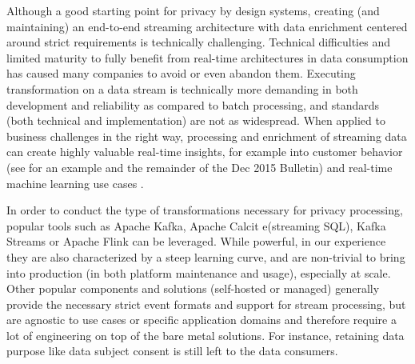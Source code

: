 \documentclass[11pt]{article} %
\begin{document}
Although a good starting point for privacy by design systems, creating (and maintaining) an end-to-end streaming architecture with data enrichment centered around strict requirements is technically challenging. Technical difficulties and limited maturity to fully benefit from real-time architectures in data consumption has caused many companies to avoid or even abandon them. Executing transformation on a data stream is technically more demanding in both development and reliability as compared to batch processing, and standards (both technical and implementation) are not as widespread. When applied to business challenges in the right way, processing and enrichment of streaming data can create highly valuable real-time insights, for example into customer behavior (see for an example \cite{fu2015streaming} and the remainder of the Dec 2015 Bulletin) and real-time machine learning use cases \cite{eugeneyan2021}. 


In order to conduct the type of transformations necessary for privacy processing, popular tools such as Apache Kafka, Apache Calcit e(streaming SQL), Kafka Streams or Apache Flink can be leveraged. While powerful, in our experience they are also characterized by a steep learning curve, and are non-trivial to bring into production (in both platform maintenance and usage), especially at scale. Other popular components and solutions (self-hosted or managed) generally provide the necessary strict event formats and support for stream processing, but are agnostic to use cases or specific application domains and therefore require a lot of engineering on top of the bare metal solutions. For instance, retaining data purpose like data subject consent is still left to the data consumers.
\end{document}

